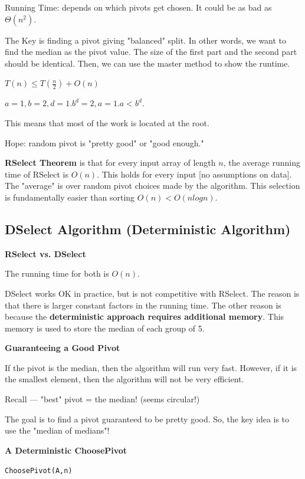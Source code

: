 \documentclass[11pt]{article}
\newcommand{\myeq}[1]{
    \vspace{11pt}
    \begin{center}
        ${#1}$
    \end{center}
    \vspace{11pt}
}
\newcommand{\myeqfol}[1]{
    \begin{center}
        ${#1}$
    \end{center}
    \vspace{11pt}
}
\newcommand{\boldsec}[1]{
    \vspace{11pt}
    \textbf{#1}
    \vspace{11pt}
}
\newcommand{\boldsecbottom}[1]{
    \textbf{#1}
    \vspace{11pt}
}
\begin{document}
Running Time: depends on which pivots get chosen. It could be as bad as $\Theta(n^2)$.

The Key is finding a pivot giving "balanced" split. In other words, we want to find the median as the pivot value. The size of the first part and the second part should be identical. Then, we can use the master method to show the runtime.

\myeq{T(n) \leq T(\frac{n}{2}) + O(n)}

\myeqfol{a=1,b=2,d=1. b^d=2, a = 1. a < b^d.}

This means that most of the work is located at the root.

Hope: random pivot is "pretty good" or "good enough."

\textbf{RSelect Theorem} is that for every input array of length $n$, the average running time of RSelect is $O(n)$. This holds for every input [no assumptions on data]. The "average" is over random pivot choices made by the algorithm. This selection is fundamentally easier than sorting $O(n) < O(nlogn)$.

\vspace{11pt}
\subsection{DSelect Algorithm (Deterministic Algorithm)}
\vspace{11pt}

\boldsecbottom{RSelect vs. DSelect}

The running time for both is $O(n)$.

DSelect works OK in practice, but is not competitive with RSelect. The reason is that there is larger constant factors in the running time. The other reason is because the \textbf{deterministic approach requires additional memory}. This memory is used to store the median of each group of 5.

\boldsec{Guaranteeing a Good Pivot}

If the pivot is the median, then the algorithm will run very fast. However, if it is the smallest element, then the algorithm will not be very efficient.

Recall --- "best" pivot = the median! (seems circular!)

The goal is to find a pivot guaranteed to be pretty good. So, the key idea is to use the "median of medians"!

\boldsec{A Deterministic ChoosePivot}

\texttt{ChoosePivot(A,n)}
\end{document}

